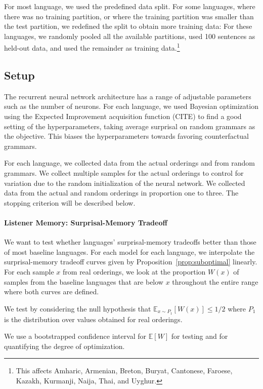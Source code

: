 \documentclass[11pt,letterpaper]{article}
\newcommand{\E}[0]{\mathbb{E}}
\begin{document}
For most language, we used the predefined data split.
For some languages, where there was no training partition, or where the training partition was smaller than the test partition, we redefined the split to obtain more training data:
For these languages, we randomly pooled all the available partitions, used 100 sentences as held-out data, and used the remainder as training data.\footnote{This affects Amharic, Armenian, Breton, Buryat, Cantonese, Faroese, Kazakh, Kurmanji, Naija, Thai, and Uyghur.}

\subsection{Setup}
The recurrent neural network architecture has a range of adjustable parameters such as the number of neurons.
For each language, we used Bayesian optimization using the Expected Improvement acquisition function (CITE) \citep{snoek-practical-2012} to find a good setting of the hyperparameters, taking average surprisal on random grammars as the objective.
This biases the hyperparameters towards favoring counterfactual grammars.


For each language, we collected data from the actual orderings and from random grammars.
We collect multiple samples for the actual orderings to control for variation due to the random initialization of the neural network.
We collected data from the actual and random orderings in proportion one to three.
The stopping criterion will be described below.



\paragraph{Listener Memory: Surprisal-Memory Tradeoff}
We want to test whether languages' surprisal-memory tradeoffs better than those of most baseline languages.
For each model for each language, we interpolate the surprisal-memory tradeoff curves given by Proposition~\ref{prop:suboptimal} linearly.
For each sample $x$ from real orderings, we look at the proportion $W(x)$ of samples from the baseline languages that are below $x$ throughout the entire range where both curves are defined.

We test by considering the null hypothesis that $\E_{x \sim P_1}[W(x)] \leq 1/2$ where $P_1$ is the distribution over values obtained for real orderings.

We use a bootstrapped confidence interval for $\E[W]$ for testing and for quantifying the degree of optimization.
\end{document}
